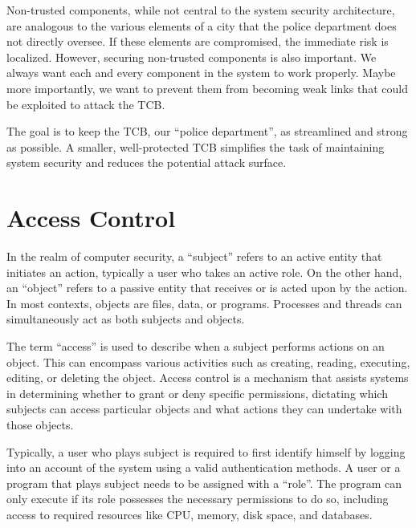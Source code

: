 Non-trusted components, while not central to the system security architecture, are analogous to the various elements of a city that the police department does not directly oversee. If these elements are compromised, the immediate risk is localized. However, securing non-trusted components is also important. We always want each and every component in the system to work properly. Maybe more importantly, we want to prevent them from becoming weak links that could be exploited to attack the TCB.

The goal is to keep the TCB, our ``police department'', as streamlined and strong as possible. A smaller, well-protected TCB simplifies the task of maintaining system security and reduces the potential attack surface.

\section{Access Control}

In the realm of computer security, a ``subject'' refers to an active entity that initiates an action, typically a user who takes an active role. On the other hand, an ``object'' refers to a passive entity that receives or is acted upon by the action. In most contexts, objects are files, data, or programs. Processes and threads can simultaneously act as both subjects and objects.

The term ``access'' is used to describe when a subject performs actions on an object. This can encompass various activities such as creating, reading, executing, editing, or deleting the object. Access control is a mechanism that assists systems in determining whether to grant or deny specific permissions, dictating which subjects can access particular objects and what actions they can undertake with those objects. 

Typically, a user who plays subject is required to first identify himself by logging into an account of the system using a valid authentication methods. A user or a program that plays subject needs to be assigned with a ``role''. The program can only execute if its role possesses the necessary permissions to do so, including access to required resources like CPU, memory, disk space, and databases.

